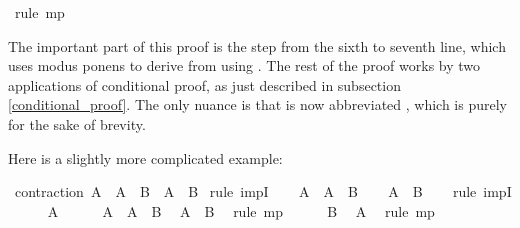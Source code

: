 \begin{isabellebody}
\ {\isacharparenleft}rule\ mp{\isacharparenright}\isanewline
\ \ \isamarkupfalse%
\isanewline
{}\isamarkupfalse%
%
\endisatagproof
{\isafoldproof}%
%
\isadelimproof
%
\endisadelimproof
%
\begin{isamarkuptext}%
The important part of this proof is the step from the sixth to seventh line, which uses
modus ponens to derive  from  using . The rest of the proof
works by two applications of conditional proof, as just described in subsection \ref{conditional_proof}.
The only nuance is that  is now abbreviated , which is purely for
the sake of brevity.%
\end{isamarkuptext}\isamarkuptrue%
%
\begin{isamarkuptext}%
Here is a slightly more complicated example:%
\end{isamarkuptext}\isamarkuptrue%
\isamarkupfalse%
\ contraction{\isacharcolon}\ {\isachardoublequoteopen}{\isacharparenleft}A\ {\isasymlongrightarrow}\ A\ {\isasymlongrightarrow}\ B{\isacharparenright}\ {\isasymlongrightarrow}\ {\isacharparenleft}A\ {\isasymlongrightarrow}\ B{\isacharparenright}{\isachardoublequoteclose}\isanewline
%
\isadelimproof
%
\endisadelimproof
%
\isatagproof
{}\isamarkupfalse%
\ {\isacharparenleft}rule\ impI{\isacharparenright}\isanewline
\ \ \isamarkupfalse%
\ {\isachardoublequoteopen}A\ {\isasymlongrightarrow}\ A\ {\isasymlongrightarrow}\ B{\isachardoublequoteclose}\isanewline
\ \ \isamarkupfalse%
\ {\isachardoublequoteopen}A\ {\isasymlongrightarrow}\ B{\isachardoublequoteclose}\isanewline
\ \ \isamarkupfalse%
\ {\isacharparenleft}rule\ impI{\isacharparenright}\isanewline
\ \ \ \ \isamarkupfalse%
\ {\isachardoublequoteopen}A{\isachardoublequoteclose}\isanewline
\ \ \ \ \isamarkupfalse%
\ {\isacharbackquoteopen}A\ {\isasymlongrightarrow}\ A\ {\isasymlongrightarrow}\ B{\isacharbackquoteclose}\ \isamarkupfalse%
\ {\isachardoublequoteopen}A\ {\isasymlongrightarrow}\ B{\isachardoublequoteclose}\ \isamarkupfalse%
\ {\isacharparenleft}rule\ mp{\isacharparenright}\isanewline
\ \ \ \ \isamarkupfalse%
\ {\isachardoublequoteopen}B{\isachardoublequoteclose}\ \isamarkupfalse%
\ {\isacharbackquoteopen}A{\isacharbackquoteclose}\ \isamarkupfalse%
\ {\isacharparenleft}rule\ mp{\isacharparenright}\isanewline
\ \ \isamarkupfalse%

\end{isabellebody}
